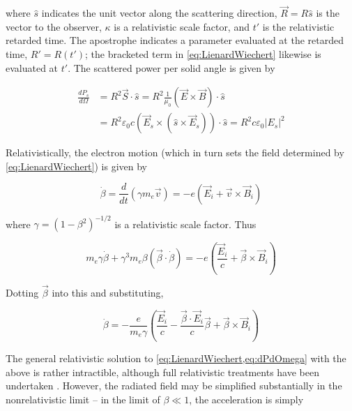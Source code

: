 \noindent where $\hat{s}$ indicates the unit vector along the scattering direction, $\vec{R} = R\hat{s}$ is the vector to the observer, $\kappa$ is a relativistic scale factor, and $t'$ is the relativistic retarded time.  The apostrophe indicates a parameter evaluated at the retarded time, \ie $R' = R(t')$; the bracketed term in \cref{eq:LienardWiechert} likewise is evaluated at $t'$.  The scattered power per solid angle is given by

\begin{equation}\label{eq:dPdOmega}
 \begin{aligned}
  \frac{dP_s}{d\Omega} &= R^2 \vec{S}\cdot\hat{s} = R^2 \frac{1}{\mu_0} \left(\vec{E} \times \vec{B}\right)\cdot\hat{s}\\
  &= R^2 \varepsilon_0 c \left(\vec{E}_s \times \left(\hat{s} \times \vec{E}_s\right)\right) \cdot \hat{s} = R^2 c \varepsilon_0 \left|E_s\right|^2
 \end{aligned}
\end{equation}

\noindent Relativistically, the electron motion (which in turn sets the field determined by \cref{eq:LienardWiechert}) is given by

\begin{equation}\label{eq:betadot}
 \dot{\beta} = \frac{d}{dt}\left(\gamma m_e \vec{v}\right) = -e\left(\vec{E}_i + \vec{v} \times \vec{B}_i\right)
\end{equation}

\noindent where $\gamma = \left(1-\beta^2\right)^{-1/2}$ is a relativistic scale factor.  Thus

\begin{equation}\label{eq:betadot2}
 m_e \gamma \dot{\beta} + \gamma^3 m_e \beta \left(\vec{\beta}\cdot\dot{\beta}\right) = -e \left(\frac{\vec{E}_i}{c} + \vec{\beta}\times\vec{B}_i\right)
\end{equation}

\noindent Dotting $\vec{\beta}$ into this and substituting,

\begin{equation}\label{eq:betadot3}
 \dot{\beta} = -\frac{e}{m_e \gamma} \left( \frac{\vec{E}_i}{c} - \frac{\vec{\beta}\cdot\vec{E}_i}{c} \vec{\beta} + \vec{\beta} \times \vec{B}_i \right)
\end{equation}

\noindent The general relativistic solution to \cref{eq:LienardWiechert,eq:dPdOmega} with the above is rather intractible, although full relativistic treatments have been undertaken \cite{Sheffield1972,Matoba1978,Selden1980,Naito1993}.  However, the radiated field may be simplified substantially in the nonrelativistic limit -- in the limit of $\beta \ll 1$, the acceleration is simply

